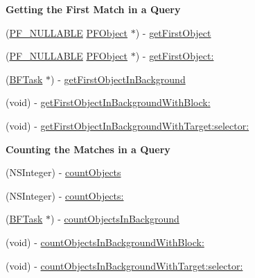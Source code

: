 \begin{Indent}{\bf Getting the First Match in a Query}\par
{\em 

 

 }\begin{DoxyCompactItemize}
\item 
(\hyperlink{_p_f_nullability_8h_a528d97a96c5fb279a45c378f5657fca2}{P\+F\+\_\+\+N\+U\+L\+L\+A\+B\+L\+E} \hyperlink{interface_p_f_object}{P\+F\+Object} $\ast$) -\/ \hyperlink{interface_p_f_query_aca13824e8ce4e4cb75c083ac02010e45}{get\+First\+Object}
\item 
(\hyperlink{_p_f_nullability_8h_a528d97a96c5fb279a45c378f5657fca2}{P\+F\+\_\+\+N\+U\+L\+L\+A\+B\+L\+E} \hyperlink{interface_p_f_object}{P\+F\+Object} $\ast$) -\/ \hyperlink{interface_p_f_query_aff8cd210df6bf969dead723954546878}{get\+First\+Object\+:}
\item 
(\hyperlink{interface_b_f_task}{B\+F\+Task} $\ast$) -\/ \hyperlink{interface_p_f_query_a313ff9dfc99be21151d916698a3f280b}{get\+First\+Object\+In\+Background}
\item 
(void) -\/ \hyperlink{interface_p_f_query_ae7daa7d5b9c40954ed169da0b626dc4b}{get\+First\+Object\+In\+Background\+With\+Block\+:}
\item 
(void) -\/ \hyperlink{interface_p_f_query_af9edc98e26f4252858840849550365dd}{get\+First\+Object\+In\+Background\+With\+Target\+:selector\+:}
\end{DoxyCompactItemize}
\end{Indent}
\begin{Indent}{\bf Counting the Matches in a Query}\par
{\em 

 

 }\begin{DoxyCompactItemize}
\item 
(N\+S\+Integer) -\/ \hyperlink{interface_p_f_query_a6ebbe63649efa155538708ebc27ca401}{count\+Objects}
\item 
(N\+S\+Integer) -\/ \hyperlink{interface_p_f_query_a6211e0b92adc4a098b65e24a4cbdbaa0}{count\+Objects\+:}
\item 
(\hyperlink{interface_b_f_task}{B\+F\+Task} $\ast$) -\/ \hyperlink{interface_p_f_query_aa245ae756565020ea3ea5c4868a50c4e}{count\+Objects\+In\+Background}
\item 
(void) -\/ \hyperlink{interface_p_f_query_aee1f2eda23f393ae42c160c0a2e295b7}{count\+Objects\+In\+Background\+With\+Block\+:}
\item 
(void) -\/ \hyperlink{interface_p_f_query_a7ba19171844b81668772a02f8bdc5a04}{count\+Objects\+In\+Background\+With\+Target\+:selector\+:}
\end{DoxyCompactItemize}
\end{Indent}
